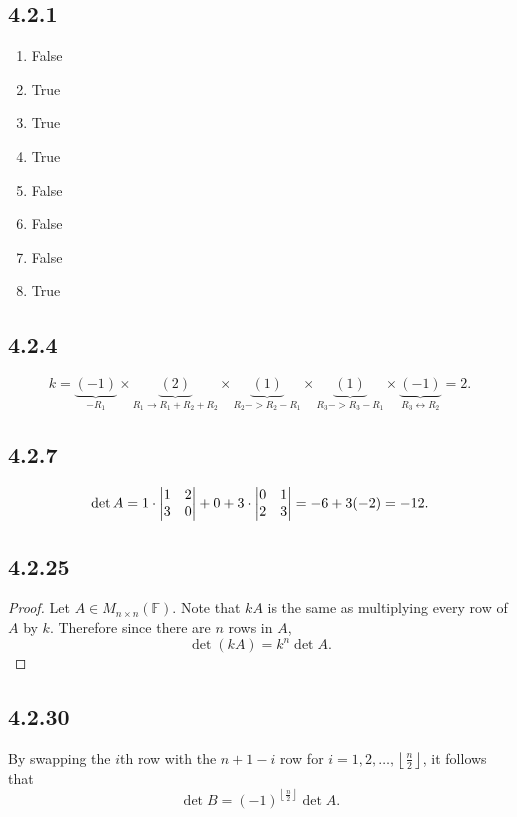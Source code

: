 \documentclass[12pt,titlepage]{extarticle}
\begin{document}
\subsection*{4.2.1}
\begin{enumerate}[label=\alph*)]
    \item False
    \item True
    \item True
    \item True
    \item False
    \item False
    \item False
    \item True
\end{enumerate}

\subsection*{4.2.4}
\[
    k = 
    \underbrace{(-1)}_{-R_1}
    \times\underbrace{(2)}_{R_1 \to R_1 + R_2 + R_2}
    \times\underbrace{(1)}_{R_2 -> R_2 - R_1}
    \times\underbrace{(1)}_{R_3 -> R_3 - R_1}
    \times\underbrace{(-1)}_{R_3 \leftrightarrow R_2}
    = 2
.\]

\subsection*{4.2.7}
\[
    \det A = 1\cdot \mqty|
        1 & 2 \\
        3 & 0
    | + 0 + 3 \cdot \mqty|
        0 & 1 \\
        2 & 3
    | = -6 + 3 (-2) = -12
.\]

\subsection*{4.2.25}
\begin{proof}
    Let $A \in M_{n\times n}(\mathbb{F})$. Note that $kA$ is the same as multiplying every row of $A$ by $k$. Therefore since there are $n$ rows in $A$,
    \[
        \det (kA) = k^n \det A
    .\]
\end{proof}

\subsection*{4.2.30}
By swapping the $i$th row with the $n + 1 - i$ row for $i = 1,2,\ldots, \left\lfloor \frac{n}{2} \right\rfloor$, it follows that
\[
    \det B = (-1)^{\left\lfloor \frac{n}{2} \right\rfloor} \det A
.\]
\end{document}
